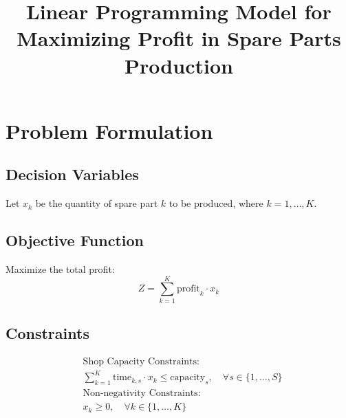 \documentclass{article}
\begin{document}
\title{Linear Programming Model for Maximizing Profit in Spare Parts Production}
\author{}
\date{}
\maketitle

\section*{Problem Formulation}

\subsection*{Decision Variables}
Let \( x_k \) be the quantity of spare part \( k \) to be produced, where \( k = 1, \ldots, K \).

\subsection*{Objective Function}
Maximize the total profit:
\[
Z = \sum_{k=1}^{K} \text{profit}_k \cdot x_k
\]

\subsection*{Constraints}
\begin{align*}
&\text{Shop Capacity Constraints:} \\
&\sum_{k=1}^{K} \text{time}_{k, s} \cdot x_k \leq \text{capacity}_s, \quad \forall s \in \{1, \ldots, S\} \\

&\text{Non-negativity Constraints:} \\
&x_k \geq 0, \quad \forall k \in \{1, \ldots, K\}
\end{align*}
\end{document}
